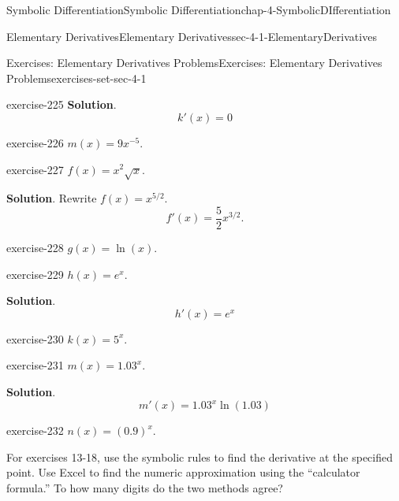 \documentclass[oneside,10pt,]{book}
\numberwithin{equation}{section}
\begin{document}
\begin{chapterptx}{Symbolic Differentiation}{}{Symbolic Differentiation}{}{}{chap-4-SymbolicDIfferentiation}
\begin{sectionptx}{Elementary Derivatives}{}{Elementary Derivatives}{}{}{sec-4-1-ElementaryDerivatives}
\begin{exercises-subsection-numberless}{Exercises: Elementary Derivatives Problems}{}{Exercises: Elementary Derivatives Problems}{}{}{exercises-set-sec-4-1}
\begin{divisionexercise}{5}{}{}{exercise-225}
\noindent\textbf{Solution}.\hypertarget{solution-112}{}\quad%
%
\begin{equation*}
k'(x)=0
\end{equation*}
\end{divisionexercise}%
\begin{divisionexercise}{6}{}{}{exercise-226}%
\hypertarget{p-1485}{}%
\(m(x)=9x^{-5}\).%
\end{divisionexercise}%
\begin{divisionexercise}{7}{}{}{exercise-227}%
\hypertarget{p-1486}{}%
\(f(x)=x^2 \sqrt{x}\).%
\par\smallskip%
\noindent\textbf{Solution}.\hypertarget{solution-113}{}\quad%
\hypertarget{p-1487}{}%
Rewrite \(f(x)=x^{5/2}\).%
%
\begin{equation*}
f'(x)=\frac{5}{2}x^{3/2} \text{.}
\end{equation*}
\end{divisionexercise}%
\begin{divisionexercise}{8}{}{}{exercise-228}%
\hypertarget{p-1488}{}%
\(g(x)=\ln(x)\).%
\end{divisionexercise}%
\begin{divisionexercise}{9}{}{}{exercise-229}%
\hypertarget{p-1489}{}%
\(h(x)=e^x\).%
\par\smallskip%
\noindent\textbf{Solution}.\hypertarget{solution-114}{}\quad%
%
\begin{equation*}
h'(x)=e^x
\end{equation*}
\end{divisionexercise}%
\begin{divisionexercise}{10}{}{}{exercise-230}%
\hypertarget{p-1490}{}%
\(k(x)=5^x\).%
\end{divisionexercise}%
\begin{divisionexercise}{11}{}{}{exercise-231}%
\hypertarget{p-1491}{}%
\(m(x)=1.03^x\).%
\par\smallskip%
\noindent\textbf{Solution}.\hypertarget{solution-115}{}\quad%
%
\begin{equation*}
m'(x)=1.03^x\ln(1.03)
\end{equation*}
\end{divisionexercise}%
\begin{divisionexercise}{12}{}{}{exercise-232}%
\hypertarget{p-1492}{}%
\(n(x)=(0.9)^x\).%
\end{divisionexercise}%
\hypertarget{p-1493}{}%
For exercises 13-18, use the symbolic rules to find the derivative at the specified point.  Use Excel to find the numeric approximation using the ``calculator formula.''  To how many digits do the two methods agree?%

\end{exercises-subsection-numberless}
\end{sectionptx}
\end{chapterptx}
\end{document}

